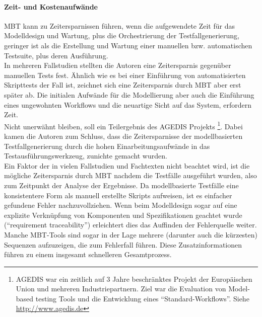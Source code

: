 \paragraph{Zeit- und Kostenaufwände} MBT kann zu Zeitersparnissen führen, wenn die aufgewendete Zeit für das Modelldesign und Wartung, plus die Orchestrierung der Testfallgenerierung, geringer ist als die Erstellung und Wartung einer manuellen bzw. automatischen Testsuite, plus deren Ausführung.\\
In mehreren Fallstudien stellten die Autoren eine Zeitersparnis gegenüber manuellen Tests fest.\cite{farchi_using_2002}\cite{prenninger_mbt_2005}\cite{pretschner_one_2005} Ähnlich wie es bei einer Einführung von automatisierten Skripttests der Fall ist, zeichnet sich eine Zeitersparnis durch MBT aber erst später ab. Die initialen Aufwände für die Modellierung aber auch die Einführung eines ungewohnten Workflows und die neuartige Sicht auf das System, erfordern Zeit.\\
Nicht unerwähnt bleiben, soll ein Teilergebnis des AGEDIS Projekts \footnote{AGEDIS war ein zeitlich auf 3 Jahre beschränktes Projekt der Europäischen Union und mehreren Industriepartnern. Ziel war die Evaluation von Model-based testing Tools und die Entwicklung eines ``Standard-Workflows''. Siehe \url{http://www.agedis.de}}. Dabei kamen die Autoren zum Schluss, dass die Zeitersparnisse der modellbasierten Testfallgenerierung durch die hohen Einarbeitungsaufwände in das Testausführungswerkzeug, zunichte gemacht wurden.\cite{craggs_agedis_2003}\\
Ein Faktor der in vielen Fallstudien und Fachtexten nicht beachtet wird, ist die mögliche Zeitersparnis durch MBT nachdem die Testfälle ausgeführt wurden, also zum Zeitpunkt der Analyse der Ergebnisse. Da modellbasierte Testfälle eine konsistentere Form als manuell erstellte Skripts aufweisen, ist es einfacher gefundene Fehler nachzuvollziehen. Wenn beim Modelldesign sogar auf eine explizite Verknüpfung von Komponenten und Spezifikationen geachtet wurde (``requirement traceability'') erleichtert dies das Auffinden der Fehlerquelle weiter. Manche MBT-Tools sind sogar in der Lage mehrere (darunter auch die kürzesten) Sequenzen aufzuzeigen, die zum Fehlerfall führen. Diese Zusatzinformationen führen zu einem insgesamt schnelleren Gesamtprozess.\cite{utting_practical_2007}

